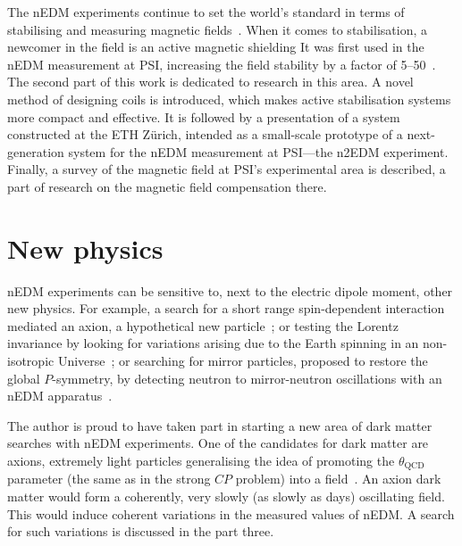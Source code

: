 The nEDM experiments continue to set the world's standard in terms of stabilising and measuring magnetic fields~\cite{GREEN1998381,1748-0221-10-12-P12003,Groeger2005,Baker2014}. When it comes to stabilisation, a newcomer in the field is an active magnetic shielding It was first used in the nEDM measurement at PSI, increasing the field stability by a factor of 5--50~\cite{Afach2014}. The second part of this work is dedicated to research in this area. A novel method of designing coils is introduced, which makes active stabilisation systems more compact and effective. It is followed by a presentation of a system constructed at the ETH Zürich, intended as a small-scale prototype of a next-generation system for the nEDM measurement at PSI---the n2EDM experiment. Finally, a survey of the magnetic field at PSI's experimental area is described, a part of research on the magnetic field compensation there.




\section{New physics}
nEDM experiments can be sensitive to, next to the electric dipole moment, other new physics. For example, a search for a short range spin-dependent interaction mediated an axion, a hypothetical new particle~\cite{Afach2015Exotic}; or testing the Lorentz invariance by looking for variations arising due to the Earth spinning in an non-isotropic Universe~\cite{Altarev2009,ALTAREV20112365}; or searching for mirror particles, proposed to restore the global $P$-symmetry, by detecting neutron to mirror-neutron oscillations with an nEDM apparatus~\cite{PhysRevD.80.032003}.

The author is proud to have taken part in starting a new area of dark matter searches with nEDM experiments. One of the candidates for dark matter are axions, extremely light particles generalising the idea of promoting the $\theta_\text{QCD}$ parameter (the same as in the strong $CP$ problem) into a field~\cite{PhysRevLett.38.1440}. An axion dark matter would form a coherently, very slowly (as slowly as days) oscillating field. This would induce coherent variations in the measured values of nEDM\@. A search for such variations is discussed in the part three.